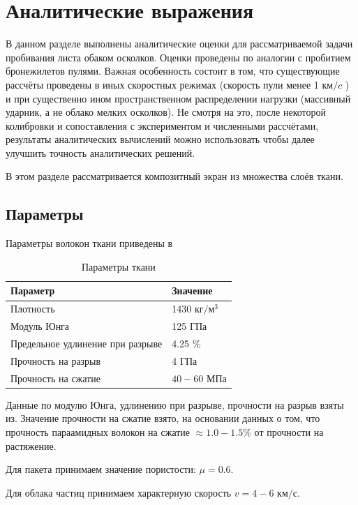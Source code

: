 \chapter{Аналитические выражения}\label{ch:equations}
В данном разделе выполнены аналитические оценки для рассматриваемой задачи пробивания листа обаком осколков.
Оценки проведены по аналогии с пробитием бронежилетов пулями.
Важная особенность состоит в том, что существующие рассчёты проведены в иных скоростных режимах (скорость пули менее
1 $км/c$ ) и при существенно ином пространственном распределении нагрузки (массивный ударник, а не облако мелких
осколков).
Не смотря на это, после некоторой колибровки и сопоставления с экспериментом и численными рассчётами, результаты
аналитических вычислений можно использовать чтобы далее улучшить точность аналитических решений.

В этом разделе рассматривается композитный экран из множества слоёв ткани.
\section*{Параметры}
Параметры волокон ткани приведены в 

\begin{table}[h]
    \centering
    \caption{Параметры ткани}\label{tbl:kevlar-params}
    \begin{tabular}{|l|l|}
        \hline
        Параметр & Значение      \\ \hline
        Плотность & 1430 $кг/м^3$ \\ \hline
        Модуль Юнга & 125 ГПа       \\ \hline
        Предельное удлинение при разрыве & 4.25 \%       \\ \hline
        Прочность на разрыв & 4 ГПа         \\ \hline
        Прочность на сжатие & $40-60$ МПа     \\ \hline
    \end{tabular}
\end{table}

Данные по модулю Юнга, удлинению при разрыве, прочности на разрыв взяты из\cite{perepelkin2009,mikhailin2013}.
Значение прочности на сжатие взято, на основании данных\cite{papkov1986} о том, что прочность параамидных волокон
на сжатие $\approx 1.0 - 1.5 \%$ от прочности на растяжение.

Для пакета принимаем значение пористости: $\mu=0.6$\cite{buzov2004}.

Для облака частиц принимаем характерную скорость $v=4-6$ $км/с$.

